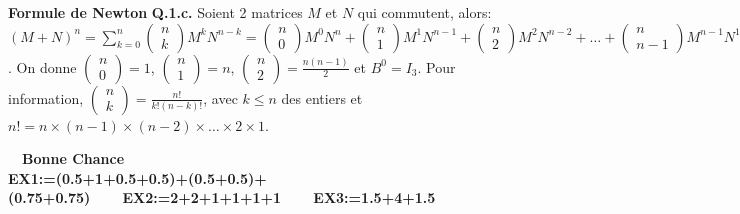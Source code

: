 \documentclass[12pt,fleqn]{report}
\newcommand{\hr}{\hrulefill}
\begin{document}
\textbf{\large{Formule de Newton}} \hr \textbf{Q.1.c.}
\newline
 Soient 2 matrices $M$ et $N$ qui commutent, alors: $(M+N)^n = \sum_{k=0}^n \begin{pmatrix} n \\ k \end{pmatrix} M^k N^{n-k} = \begin{pmatrix} n \\ 0 \end{pmatrix}M^0N^n + \begin{pmatrix} n \\ 1 \end{pmatrix}M^1N^{n-1} + \begin{pmatrix} n \\ 2 \end{pmatrix}M^2N^{n-2} + \dots + \begin{pmatrix} n \\ n-1 \end{pmatrix}M^{n-1}N^{1} + \begin{pmatrix} n \\ n \end{pmatrix}M^{n}N^{0}$. 
 \newline
 On donne $\begin{pmatrix} n \\ 0 \end{pmatrix} = 1$, $\begin{pmatrix} n \\ 1 \end{pmatrix} = n$, $\begin{pmatrix} n \\ 2 \end{pmatrix} = \frac{n(n-1)}{2}$ et $B^0=I_3$. 
 \newline
 Pour information, $ \begin{pmatrix} n \\ k \end{pmatrix} = \frac{n!}{k!(n-k)!}$, avec $k \leq n$ des entiers et $n! = n \times (n-1) \times (n-2) \times \dots \times 2 \times 1$.

	\ \hr \ \textbf{Bonne Chance} \\
\textbf{EX1:=(0.5+1+0.5+0.5)+(0.5+0.5)+(0.75+0.75)\ \ \ \ EX2:=2+2+1+1+1+1\ \ \ \ EX3:=1.5+4+1.5}
\end{document}
